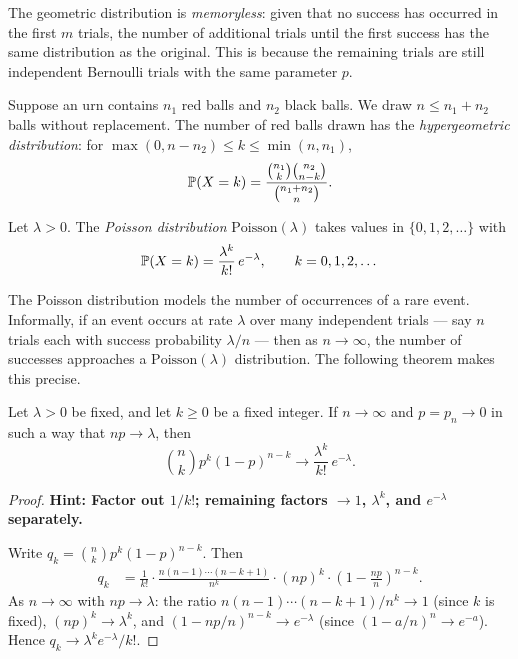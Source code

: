 \documentclass[a4paper]{article}
\begin{document}
\begin{remark}
  The geometric distribution is \emph{memoryless}: given that no success has occurred in the first $m$ trials, the number of additional trials until the first success has the same distribution as the original. This is because the remaining trials are still independent Bernoulli trials with the same parameter $p$.
\end{remark}

\begin{defi}
  Suppose an urn contains $n_1$ red balls and $n_2$ black balls. We draw $n \leq n_1 + n_2$ balls without replacement. The number of red balls drawn has the \emph{hypergeometric distribution}: for $\max(0, n - n_2) \leq k \leq \min(n, n_1)$,
  \[
    \P(X = k) = \frac{\binom{n_1}{k}\binom{n_2}{n - k}}{\binom{n_1 + n_2}{n}}.
  \]
\end{defi}

\begin{defi}
  Let $\lambda > 0$. The \emph{Poisson distribution} $\mathrm{Poisson}(\lambda)$ takes values in $\{0, 1, 2, \dotsc\}$ with
  \[
    \P(X = k) = \frac{\lambda^k}{k!}\,e^{-\lambda}, \qquad k = 0, 1, 2, \dotsc
  \]
\end{defi}

\begin{remark}
  The Poisson distribution models the number of occurrences of a rare event. Informally, if an event occurs at rate $\lambda$ over many independent trials --- say $n$ trials each with success probability $\lambda/n$ --- then as $n \to \infty$, the number of successes approaches a $\mathrm{Poisson}(\lambda)$ distribution. The following theorem makes this precise.
\end{remark}

\begin{thm}
  Let $\lambda > 0$ be fixed, and let $k \geq 0$ be a fixed integer. If $n\to \infty$ and $p = p_n \to 0$ in such a way that $np \to \lambda$, then
  \[
    \binom{n}{k}p^k(1 -p)^{n - k} \to \frac{\lambda^k}{k!}\,e^{-\lambda}.
  \]
\end{thm}

\begin{proof}
  \textbf{Hint: Factor out $1/k!$; remaining factors $\to 1$, $\lambda^k$, and $e^{-\lambda}$ separately.}

  Write $q_k = \binom{n}{k}p^k(1 - p)^{n - k}$. Then
  \begin{align*}
    q_k &= \frac{1}{k!} \cdot \frac{n(n - 1)\cdots(n - k + 1)}{n^k}\cdot (np)^k \cdot \left(1 - \frac{np}{n}\right)^{n - k}.
  \end{align*}
  As $n \to \infty$ with $np \to \lambda$: the ratio $n(n-1)\cdots(n-k+1)/n^k \to 1$ (since $k$ is fixed), $(np)^k \to \lambda^k$, and $(1 - np/n)^{n-k} \to e^{-\lambda}$ (since $(1 - a/n)^n \to e^{-a}$). Hence $q_k \to \lambda^k e^{-\lambda}/k!$.
\end{proof}
\end{document}
